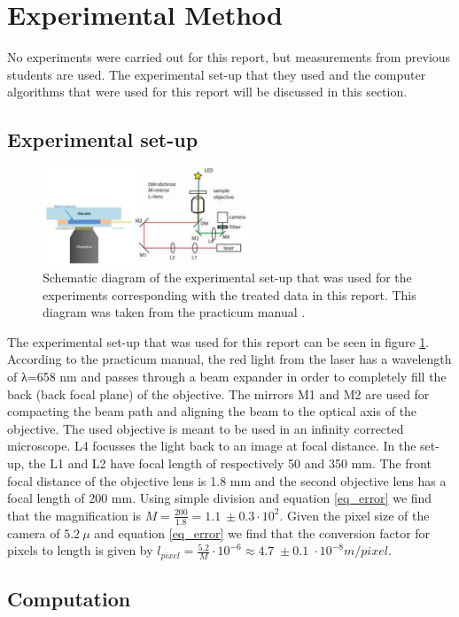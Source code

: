 \section{Experimental Method}

No experiments were carried out for this report, but measurements from previous students are used. The experimental set-up that they used and the computer algorithms that were used for this report will be discussed in this section.

\subsection{Experimental set-up}

\begin{figure}
    \centering
    \includegraphics[width=0.55\textwidth,keepaspectratio]{figures/setup.png}
    \caption{Schematic diagram of the experimental set-up that was used for the experiments corresponding with the treated data in this report. This diagram was taken from the practicum manual \cite{practicum_manual}.}
    \label{fig_setup}
\end{figure}


The experimental set-up that was used for this report can be seen in figure \ref{fig_setup}. 
According to the practicum manual, the red light from the laser has a wavelength of λ=658 nm and passes through a beam expander in order to completely fill the back (back focal plane) of the objective. 
The mirrors M1 and M2 are used for compacting the beam path and aligning the beam to the optical axis of the objective. 
The used objective is meant to be used in an infinity corrected microscope. 
L4 focusses the light back to an image at focal distance. 
In the set-up, the L1 and L2 have focal length of respectively 50 and 350 mm. The front focal distance of the objective lens is 1.8 mm and the second objective lens has a focal length of 200 mm. Using simple division and equation \ref{eq_error} we find that the magnification is  $ M = \frac{200}{1.8} = 1.1  \: \pm 0.3 \cdot 10^2$. Given the pixel size of the camera of $ 5.2 \: \mu $  and equation  \ref{eq_error} we find that the conversion factor for pixels to length is given by $l_{pixel} = \frac{5.2}{M} \cdot 10^{-6} \approx 4.7 \; \pm 0.1 \; \cdot 10^{-8} m/pixel$.

\subsection{Computation}



